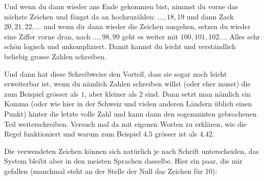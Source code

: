 Und wenn du dann wieder ans Ende gekommen bist, nimmst du vorne das nächste Zeichen und fängst da an hochzuzählen: $\dots, 18, 19$ und dann Zack $20, 21, 22,\dots$ und wenn dir dann wieder die Zeichen ausgehen, setzen du wieder eine Ziffer vorne dran, nach $\dots, 98, 99$ geht es weiter mit $100, 101,102\dots$. Alles sehr schön logisch und unkompliziert. Damit kannst du leicht und verständlich beliebig grosse Zahlen schreiben.

Und dann hat diese Schreibweise den Vorteil, dass sie sogar noch leicht erweiterbar ist, wenn du nämlich Zahlen schreiben willst (oder eher musst) die zum Beispiel grösser als $1$, aber kleiner als $2$ sind. Dann setzt man nämlich ein Komma (oder wie hier in der Schweiz und vielen anderen Ländern üblich einen Punkt) hinter die letzte volle Zahl und kann dann den sogenannten gebrochenen Teil weiterschreiben. Versuch mal da mit eigenen Worten zu erklären, wie die Regel funktioniert und warum zum Beispiel $4.5$ grösser ist als $4.42$.

Die verwendeten Zeichen können sich natürlich je nach Schrift unterscheiden, das System bleibt aber in den meisten Sprachen dasselbe. Hier ein paar, die mir gefallen (manchmal steht an der Stelle der Null das Zeichen für 10):

